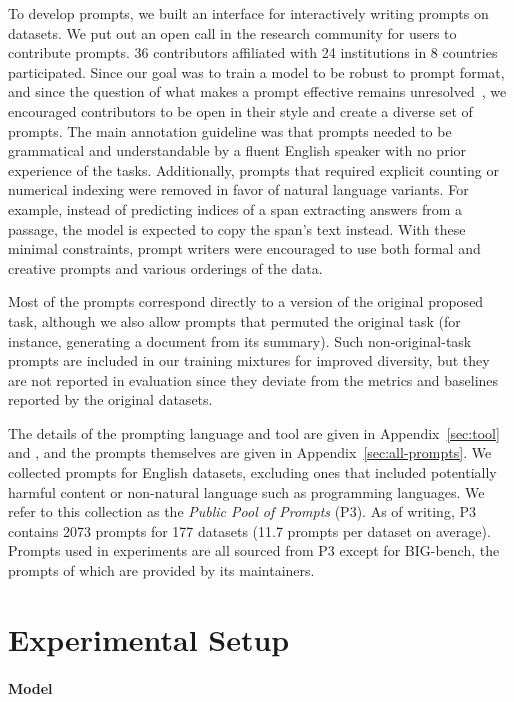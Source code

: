 To develop prompts, we built an interface for interactively writing prompts on datasets. We put out an open call in the research community for users to contribute prompts. 36 contributors affiliated with 24 institutions in 8 countries participated. Since our goal was to train a model to be robust to prompt format, and since the question of what makes a prompt effective remains unresolved~\citep{webson-pavlick-2021,logan2021cutting,zhao2021calibrate}, we encouraged contributors to be open in their style and create a diverse set of prompts. The main annotation guideline was that prompts needed to be grammatical and understandable by a fluent English speaker with no prior experience of the tasks. Additionally, prompts that required explicit counting or numerical indexing were removed in favor of natural language variants. For example, instead of predicting indices of a span extracting answers from a passage, the model is expected to copy the span's text instead. With these minimal constraints, prompt writers were encouraged to use both formal and creative prompts and various orderings of the data. 

Most of the prompts correspond directly to a version of the original proposed task, although we also allow prompts that permuted the original task (for instance, generating a document from its summary). Such non-original-task prompts are included in our training mixtures for improved diversity, but they are not reported in evaluation since they deviate from the metrics and baselines reported by the original datasets.

The details of the prompting language and tool are given in Appendix~\ref{sec:tool} and \citet{promptsource}, and the prompts themselves are given in Appendix~\ref{sec:all-prompts}. We collected prompts for English datasets, excluding ones that included potentially harmful content or non-natural language such as programming languages. We refer to this collection as the \textit{Public Pool of Prompts} (P3). As of writing, P3 contains 2073 prompts for 177 datasets (11.7 prompts per dataset on average). Prompts used in experiments are all sourced from P3 except for BIG-bench, the prompts of which are provided by its maintainers. 

\section{Experimental Setup}
\label{sec:details}

\paragraph{Model}

